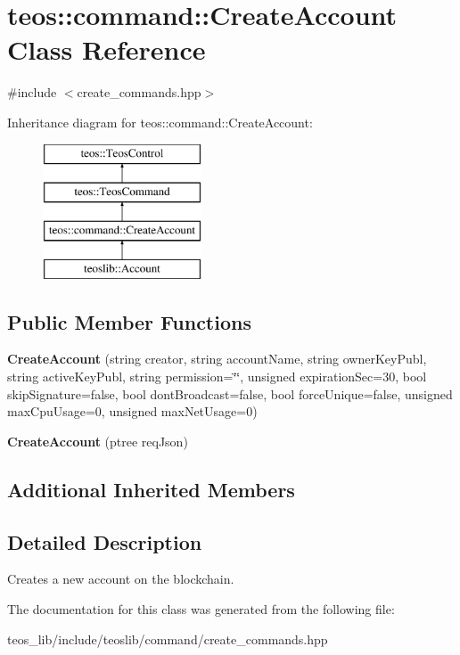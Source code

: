 \hypertarget{classteos_1_1command_1_1_create_account}{}\section{teos\+:\+:command\+:\+:Create\+Account Class Reference}
\label{classteos_1_1command_1_1_create_account}


{\ttfamily \#include $<$create\+\_\+commands.\+hpp$>$}

Inheritance diagram for teos\+:\+:command\+:\+:Create\+Account\+:\begin{figure}[H]
\begin{center}
\leavevmode
\includegraphics[height=4.000000cm]{classteos_1_1command_1_1_create_account}
\end{center}
\end{figure}
\subsection*{Public Member Functions}
\begin{DoxyCompactItemize}
\item 
\mbox{\label{classteos_1_1command_1_1_create_account_aa5fc119e457ddaa39bb04d94c95430c2}} 
{\bfseries Create\+Account} (string creator, string account\+Name, string owner\+Key\+Publ, string active\+Key\+Publ, string permission=\char`\"{}\char`\"{}, unsigned expiration\+Sec=30, bool skip\+Signature=false, bool dont\+Broadcast=false, bool force\+Unique=false, unsigned max\+Cpu\+Usage=0, unsigned max\+Net\+Usage=0)
\item 
\mbox{\label{classteos_1_1command_1_1_create_account_a5431fb149148b10c14e59b4fc0e99fbd}} 
{\bfseries Create\+Account} (ptree req\+Json)
\end{DoxyCompactItemize}
\subsection*{Additional Inherited Members}


\subsection{Detailed Description}
Creates a new account on the blockchain. 

The documentation for this class was generated from the following file\+:\begin{DoxyCompactItemize}
\item 
teos\+\_\+lib/include/teoslib/command/create\+\_\+commands.\+hpp\end{DoxyCompactItemize}
